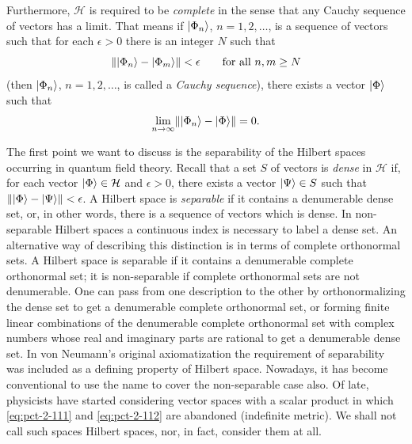 Furthermore, $\mathcal{H}$ is required to be \emph{complete} in the sense
that any Cauchy sequence of vectors has a limit.  That means if
$\lvert \Phi_n\rangle$, $n=1,2,\ldots$, is a sequence of vectors such that for each
$\epsilon>0$ there is an integer $N$ such that
\begin{equation*}
  \lVert\lvert \Phi_n\rangle-\lvert \Phi_m\rangle\rVert<\epsilon
  \qquad\text{for all }n,m\geq N
\end{equation*}
(then $\lvert \Phi_n\rangle$, $n=1,2,\ldots$, is called a \emph{Cauchy sequence}),
there exists a vector $\lvert \Phi\rangle$ such that
\begin{equation*}
  \lim_{n\to\infty}\lVert\lvert \Phi_n\rangle-\lvert \Phi\rangle\rVert=0.
\end{equation*}

The first point we want to discuss is the separability of the Hilbert spaces
occurring in quantum field theory.  Recall that a set $S$ of vectors is
\emph{dense} in $\mathcal{H}$ if, for each vector $\lvert \Phi\rangle\in\mathcal{H}$
and $\epsilon>0$, there exists a vector $\lvert \Psi\rangle\in S$ such that
$\lVert\lvert \Phi\rangle-\lvert \Psi\rangle\rVert<\epsilon$.  A Hilbert space is
\emph{separable} if it contains a denumerable dense set, or, in other words,
there is a sequence of vectors which is dense.  In non-separable Hilbert
spaces a continuous index is necessary to label a dense set.  An alternative
way of describing this distinction is in terms of complete orthonormal sets.
A Hilbert space is separable if it contains a denumerable complete
orthonormal set; it is non-separable if complete orthonormal sets are not
denumerable.  One can pass from one description to the other by
orthonormalizing the dense set to get a denumerable complete orthonormal set,
or forming finite linear combinations of the denumerable complete
orthonormal set with complex numbers whose real and imaginary parts are
rational to get a denumerable dense set.  In von Neumann's original
axiomatization the requirement of separability was included as a defining
property of Hilbert space.  Nowadays, it has become conventional to use the
name to cover the non-separable case also.  Of late, physicists have started
considering vector spaces with a scalar product in which \eqref{eq:pct-2-111} and \eqref{eq:pct-2-112}
are abandoned (indefinite metric).  We shall not call such spaces Hilbert
spaces, nor, in fact, consider them at all.

